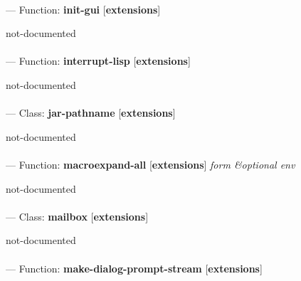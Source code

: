 \paragraph{}
\label{EXTENSIONS:INIT-GUI}
--- Function: \textbf{init-gui} [\textbf{extensions}] \textit{}

\begin{adjustwidth}{5em}{5em}
not-documented
\end{adjustwidth}

\paragraph{}
\label{EXTENSIONS:INTERRUPT-LISP}
--- Function: \textbf{interrupt-lisp} [\textbf{extensions}] \textit{}

\begin{adjustwidth}{5em}{5em}
not-documented
\end{adjustwidth}

\paragraph{}
\label{EXTENSIONS:JAR-PATHNAME}
--- Class: \textbf{jar-pathname} [\textbf{extensions}] \textit{}

\begin{adjustwidth}{5em}{5em}
not-documented
\end{adjustwidth}

\paragraph{}
\label{EXTENSIONS:MACROEXPAND-ALL}
--- Function: \textbf{macroexpand-all} [\textbf{extensions}] \textit{form \&optional env}

\begin{adjustwidth}{5em}{5em}
not-documented
\end{adjustwidth}

\paragraph{}
\label{EXTENSIONS:MAILBOX}
--- Class: \textbf{mailbox} [\textbf{extensions}] \textit{}

\begin{adjustwidth}{5em}{5em}
not-documented
\end{adjustwidth}

\paragraph{}
\label{EXTENSIONS:MAKE-DIALOG-PROMPT-STREAM}
--- Function: \textbf{make-dialog-prompt-stream} [\textbf{extensions}] \textit{}

